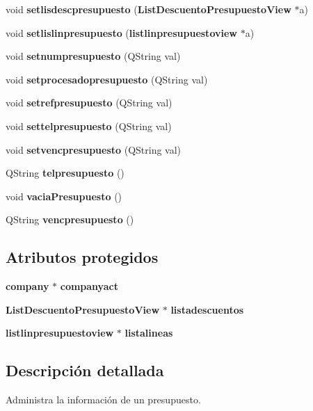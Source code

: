 \begin{CompactItemize}
\item 
void {\bf setlisdescpresupuesto} ({\bf List\-Descuento\-Presupuesto\-View} $\ast$a)\label{classpresupuesto_a49}

\item 
void {\bf setlislinpresupuesto} ({\bf listlinpresupuestoview} $\ast$a)\label{classpresupuesto_a50}

\item 
void {\bf setnumpresupuesto} (QString val)\label{classpresupuesto_a51}

\item 
void {\bf setprocesadopresupuesto} (QString val)\label{classpresupuesto_a52}

\item 
void {\bf setrefpresupuesto} (QString val)\label{classpresupuesto_a53}

\item 
void {\bf settelpresupuesto} (QString val)\label{classpresupuesto_a54}

\item 
void {\bf setvencpresupuesto} (QString val)\label{classpresupuesto_a55}

\item 
QString {\bf telpresupuesto} ()\label{classpresupuesto_a56}

\item 
void {\bf vacia\-Presupuesto} ()\label{classpresupuesto_a57}

\item 
QString {\bf vencpresupuesto} ()\label{classpresupuesto_a58}

\end{CompactItemize}
\subsection*{Atributos protegidos}
\begin{CompactItemize}
\item 
{\bf company} $\ast$ {\bf companyact}\label{classpresupuesto_p0}

\item 
{\bf List\-Descuento\-Presupuesto\-View} $\ast$ {\bf listadescuentos}\label{classpresupuesto_p1}

\item 
{\bf listlinpresupuestoview} $\ast$ {\bf listalineas}\label{classpresupuesto_p2}

\end{CompactItemize}


\subsection{Descripci\'{o}n detallada}
Administra la informaci\'{o}n de un presupuesto. 



